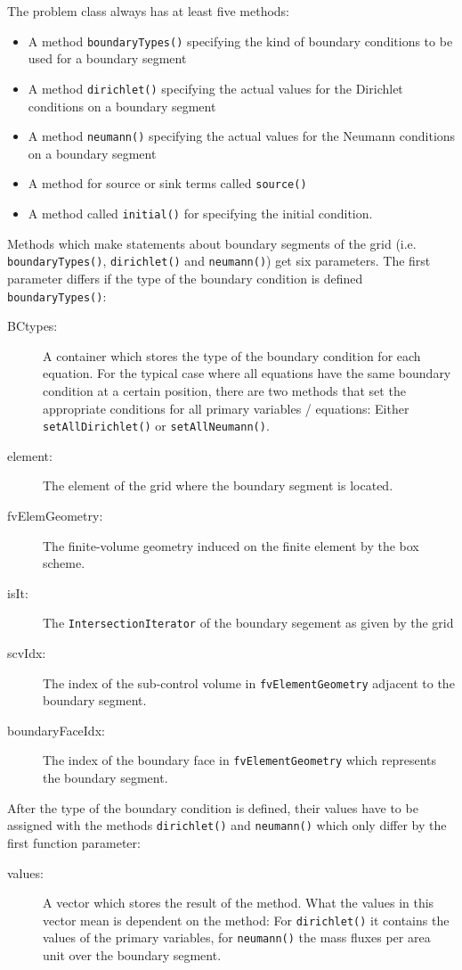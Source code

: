 The problem class always has at least five methods:
\begin{itemize}
\item A method \texttt{boundaryTypes()} specifying the kind of
  boundary conditions to be used for a boundary segment
\item A method \texttt{dirichlet()} specifying the actual values for
  the Dirichlet conditions on a boundary segment
\item A method \texttt{neumann()} specifying the actual values for
  the Neumann conditions on a boundary segment
\item A method for source or sink terms called \texttt{source()}
\item A method called \texttt{initial()} for specifying the initial
  condition.
\end{itemize}

Methods which make statements about boundary segments of the grid (i.e. 
\texttt{boundaryTypes()}, \texttt{dirichlet()} and \texttt{neumann()}) get 
six parameters. The first parameter differs if the type of the boundary condition
is defined \texttt{boundaryTypes()}:
\begin{description}
\item[BCtypes:] A container which stores the type of the boundary condition
for each equation. For the typical case where all equations have the same boundary
condition at a certain position, there are two methods that set the appropriate conditions
for all primary variables / equations: Either \texttt{setAllDirichlet()} or \texttt{setAllNeumann()}.
\item[element:] The element of the grid where the boundary segment
  is located.
\item[fvElemGeometry:] The finite-volume geometry induced on the
  finite element by the box scheme.
\item[isIt:] The \texttt{IntersectionIterator} of the boundary
  segement as given by the grid
\item[scvIdx:] The index of the sub-control volume in
  \texttt{fvElementGeometry} adjacent to the boundary segment.
\item[boundaryFaceIdx:] The index of the boundary face in
  \texttt{fvElementGeometry} which represents the boundary segment.  
\end{description}
After the type of the boundary condition is defined, their values have to be
assigned with the methods \texttt{dirichlet()} and \texttt{neumann()} which only differ 
by the first function parameter:
\begin{description}
 \item[values:] A vector which stores the result of the method. What
  the values in this vector mean is dependent on the method: For
  \texttt{dirichlet()} it contains the values of the primary
  variables, for \texttt{neumann()} the mass fluxes per area unit
  over the boundary segment.
\end{description}

